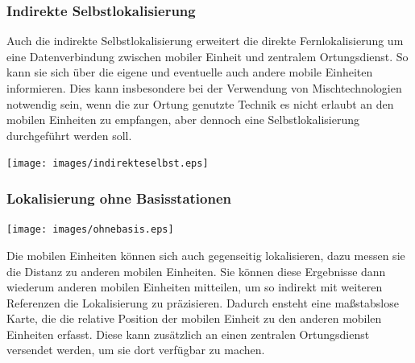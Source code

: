 \subsubsection{Indirekte Selbstlokalisierung}
	\begin{minipage}{\textwidth}
		\begin{minipage}[c][6cm][t]{0.6\textwidth\relax}
			Auch die indirekte Selbstlokalisierung erweitert die direkte Fernlokalisierung um eine Datenverbindung zwischen mobiler Einheit und zentralem Ortungsdienst.
			So kann sie sich über die eigene und eventuelle auch andere mobile Einheiten informieren.
			Dies kann insbesondere bei der Verwendung von Mischtechnologien notwendig sein, wenn die zur Ortung genutzte Technik es nicht erlaubt an den mobilen Einheiten zu empfangen, aber dennoch eine Selbstlokalisierung durchgeführt werden soll.
		\end{minipage}\hfill
		\begin{minipage}[c][6cm][c]{0.4\textwidth\relax}
			\centering
			\texttt{[image: images/indirekteselbst.eps]}
		\end{minipage}
	\end{minipage}


\subsubsection{Lokalisierung ohne Basisstationen}
	\begin{minipage}{\textwidth}
		\begin{minipage}[c][6cm][c]{0.4\textwidth\relax}
			\centering
			\texttt{[image: images/ohnebasis.eps]}
		\end{minipage}\hfill
		\begin{minipage}[c][6cm][t]{0.6\textwidth\relax}
			Die mobilen Einheiten können sich auch gegenseitig lokalisieren, dazu messen sie die Distanz zu anderen mobilen Einheiten.
			Sie können diese Ergebnisse dann wiederum anderen mobilen Einheiten mitteilen, um so indirekt mit weiteren Referenzen die Lokalisierung zu präzisieren.
			Dadurch ensteht eine maßstabslose Karte, die die relative Position der mobilen Einheit zu den anderen mobilen Einheiten erfasst.
			Diese kann zusätzlich an einen zentralen Ortungsdienst versendet werden, um sie dort verfügbar zu machen.
		\end{minipage}
	\end{minipage}


